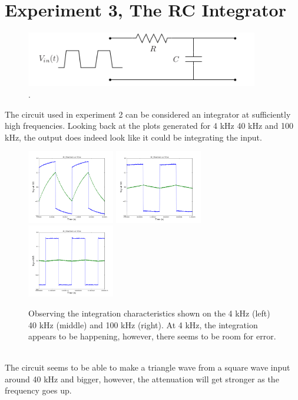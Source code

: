 \documentclass[a4paper,12pt]{article}
\begin{document}
\section*{Experiment 3, The RC Integrator}
\begin{figure}[h]
\centering
\includegraphics[width=4in]{sam_lab2/3_circuit.png}
\caption{.}
\end{figure}
The circuit used in experiment 2 can be considered an integrator at sufficiently high frequencies.  Looking back at the plots generated for 4 kHz 40 kHz and 100 kHz, the output does indeed look like it could be integrating the input.
\begin{figure}[h]
\centering
\includegraphics[width=1.5in]{sam_lab2/2g_4kHz.png}
\includegraphics[width=1.5in]{sam_lab2/2g_40kHz.png}
\includegraphics[width=1.5in]{sam_lab2/2g_100kHz.png}
\caption{Observing the integration characteristics shown on the 4 kHz (left) 40 kHz (middle) and 100 kHz (right).  At 4 kHz, the integration appears to be happening, however, there seems to be room for error.}
\end{figure}\\
The circuit seems to be able to make a triangle wave from a square wave input around 40 kHz and bigger, however, the attenuation will get stronger as the frequency goes up. \\
\end{document}
